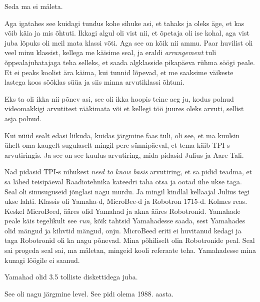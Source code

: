 
Seda ma ei mäleta. 

Aga igatahes see kuidagi tundus kohe sihuke asi, et tahaks ja oleks äge, et kas 
võib käia ja mis õhtuti. Ikkagi algul oli vist nii, et õpetaja oli ise kohal, 
aga vist  juba lõpuks oli meil mata klassi võti. Aga see on kõik nii ammu. Paar huvilist 
oli veel minu klassist, kellega me käisime seal, ja eraldi \emph{arrangement} 
tuli õppealajuhatajaga teha selleks, et saada algklasside pikapäeva rühma söögi 
peale. Et ei peaks koolist ära käima, kui tunnid lõpevad, et me saaksime 
väikeste lastega koos sööklas süüa ja siis minna arvutiklassi õhtuni. 

Eks ta oli ikka nii põnev asi, see oli ikka hoopis teine aeg ju, kodus polnud 
videomakkigi arvutitest rääkimata või et kellegi töö juures oleks arvuti, 
sellist asja polnud. 

Kui nüüd sealt edasi liikuda, kuidas järgmine faas tuli, oli see, et ma kuulsin 
ühelt oma kaugelt sugulaselt mingil pere sünnipäeval, et tema käib TPI-s 
arvutiringis. Ja see on see kuulus 
arvutiring, mida pidasid Julius ja Aare Tali. 

Nad pidasid TPI-s nihukest \emph{need to know 
basis} arvutiring, et sa pidid teadma, et sa lähed teisipäeval Raadiotehnika 
kateedri taha otsa ja 
ootad ühe ukse taga. Seal oli sinusuguseid jõnglasi nagu murdu. Ja mingil 
kindlal kellaajal Julius tegi ukse lahti. Klassis oli  
Yamaha-d, MicroBee-d ja 
Robotron 1715-d. Kolmes reas. Keskel 
MicroBeed,  ääres olid Yamahad ja akna ääres Robotronid. Yamahade peale käis 
tegelikult see \emph{run},  kõik tahtsid Yamahadesse saada, sest Yamahades olid 
mängud ja kihvtid mängud, onju. MicroBeed eriti ei huvitanud kedagi ja taga 
Robotronid oli ka nagu põnevad. Mina põhiliselt olin Robotronide peal. Seal sai 
progeda seal sai, ma mäletan, mingeid kooli referaate teha. Yamahadesse mina 
kunagi löögile ei saanud. 

Yamahad olid 3.5 tolliste diskettidega juba. 

See oli nagu järgmine level. See pidi olema 1988. aasta.


